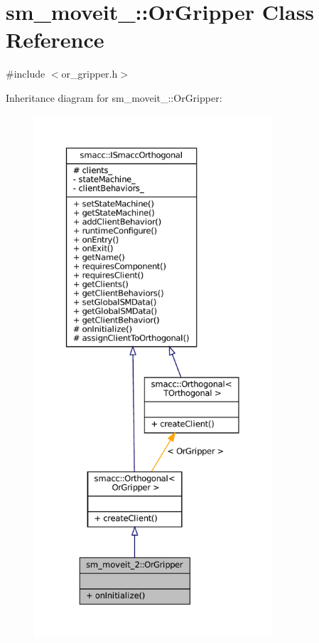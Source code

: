\hypertarget{classsm__moveit__2_1_1OrGripper}{}\section{sm\+\_\+moveit\+\_\+:\+:Or\+Gripper Class Reference}
\label{classsm__moveit__2_1_1OrGripper}


{\ttfamily \#include $<$or\+\_\+gripper.\+h$>$}



Inheritance diagram for sm\+\_\+moveit\+\_\+:\+:Or\+Gripper\+:
\nopagebreak
\begin{figure}[H]
\begin{center}
\leavevmode
\includegraphics[height=550pt]{classsm__moveit__2_1_1OrGripper__inherit__graph}
\end{center}
\end{figure}


